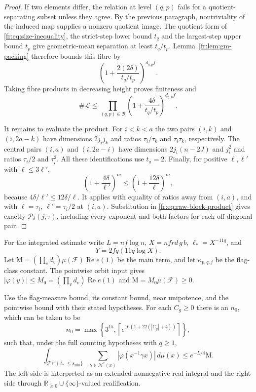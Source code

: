 \begin{proof}
If two elements differ, the relation at level $(q,p)$ fails for a quotient-separating subset unless they agree. By the previous paragraph, nontriviality of the induced map supplies a nonzero quotient image. The quotient form of \eqref{fr:eq:size-inequality}, the strict-step lower bound $t_q$ and the largest-step upper bound $t_p$ give geometric-mean separation at least $t_q/t_p$. Lemma~\ref{fr:lem:gm-packing} therefore bounds this fibre by
\[
 \left(1+\frac{2(2\delta)}{t_q/t_p}\right)^{d_{q,p}f}.
\]
Taking fibre products in decreasing height proves finiteness and
\begin{equation}\label{fr:eq:raw-block-product}
 \#\mathcal L\le\prod_{(q,p)\in\mathcal B}
 \left(1+\frac{4\delta}{t_q/t_p}\right)^{d_{q,p}f}.
\end{equation}

It remains to evaluate the product. For $i<k<a$ the two pairs $(i,k)$ and $(i,2a-k)$ have dimensions $2j_ij_k$ and ratios $\tau_i/\tau_k$ and $\tau_i\tau_k$, respectively. The central pairs $(i,a)$ and $(i,2a-i)$ have dimensions $2j_i(n-2J)$ and $j_i^2$ and ratios $\tau_i/2$ and $\tau_i^2$. All these identifications use $t_a=2$. Finally, for positive $\ell,\ell'$ with $\ell\le3\ell'$,
\[
 \left(1+\frac{4\delta}{\ell'}\right)^m
 \le\left(1+\frac{12\delta}{\ell}\right)^m,
\]
because $4\delta/\ell'\le12\delta/\ell$. It applies with equality of ratios away from $(i,a)$, and with $\ell=\tau_i$, $\ell'=\tau_i/2$ at $(i,a)$. Substitution in \eqref{fr:eq:raw-block-product} gives exactly $\mathcal P_\delta(j,\tau)$, including every exponent and both factors for each off-diagonal pair.
\end{proof}

For the integrated estimate write $L=nf\log n$, $X=nfrd\,g\,b$, $\ell_*=X^{-11q}$, and
\[
 Y=2fq(11q\log X).
\]
Let $\mathrm M=(\prod_vd_v)\mu(\mathcal F)\operatorname{Re}e(1)$ be the main term, and let $\kappa_{p,q,j}$ be the flag-class constant. The pointwise orbit input gives $|\varphi(y)|\le M_0=(\prod_vd_v)\operatorname{Re}e(1)$ and $\mathrm M=M_0\mu(\mathcal F)\ge0$.

\begin{proposition}\label{fr:prop:near-moderate}
Use the flag-measure bound, its constant bound, near unipotence, and the pointwise bound with their stated hypotheses. For each $C_g\ge0$ there is an $n_0$, which can be taken to be
\[
 n_0=\max\!\left\{3^{15},\left\lceil e^{16(1+22(|C_g|+4))}\right\rceil\right\},
\]
such that, under the full counting hypotheses with $q\ge1$,
\[
 \int_{\mathcal F\cap\{\ell_*\le s_{\min}\}}
 \sum_{\gamma\in\mathcal N^*(x)}|\varphi(x^{-1}\gamma x)|\,d\mu(x)
 \le e^{-L/4}\mathrm M.
\]
The left side is interpreted as an extended-nonnegative-real integral and the right side through $\mathbb R_{\ge0}\cup\{\infty\}$-valued realification.
\end{proposition}

